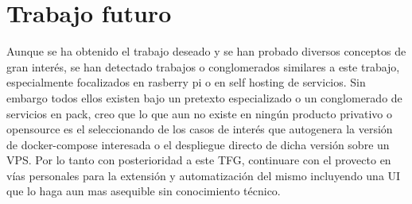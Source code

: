 \section{Trabajo futuro}
Aunque se ha obtenido el trabajo deseado y se han probado diversos conceptos de gran interés, se han detectado trabajos o conglomerados similares a este trabajo, especialmente focalizados en rasberry pi o en self hosting de servicios. Sin embargo todos ellos existen bajo un pretexto especializado o un conglomerado de servicios en pack, creo que lo que aun no existe en ningún producto privativo o opensource es el seleccionando de los casos de interés que autogenera la versión de docker-compose interesada o el despliegue directo de dicha versión sobre un VPS. Por lo tanto con posterioridad a este TFG, continuare con el provecto en vías personales para la extensión y automatización del mismo incluyendo una UI que lo haga aun mas asequible sin conocimiento técnico.